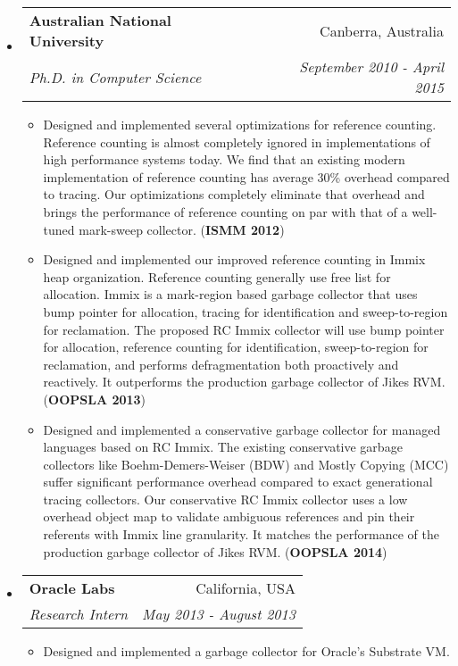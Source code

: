 \documentclass[letterpaper,11pt]{article}
\makeatletter
\newcommand{\resitem}[1]{\item #1 \vspace{-2pt}}
\newcommand{\ressubheading}[4]{
\begin{tabular*}{6.5in}{l@{\cftdotfill{\cftsecdotsep}\extracolsep{\fill}}r}
		\textbf{#1} & #2 \\
		\textit{#3} & \textit{#4} \\
\end{tabular*}\vspace{-6pt}}
\makeatother
\begin{document}
\begin{itemize}

\item
	\ressubheading{Australian National University}{Canberra,
          Australia}{Ph.D. in Computer Science}{September 2010 - April 2015}
	\begin{itemize}
	
	       \resitem {Designed and implemented several optimizations for reference counting.  Reference counting is almost completely ignored in implementations of high performance systems today. We find that an existing modern implementation of reference counting has average 30\% overhead compared to tracing. Our optimizations completely eliminate that overhead and brings the performance of reference counting on par with that of a well-tuned mark-sweep collector. ({\bf ISMM 2012})}


		\resitem {Designed and implemented our improved reference counting in Immix heap organization. Reference counting generally use free list for allocation. Immix is a mark-region based garbage collector that uses bump pointer for allocation, tracing for identification and sweep-to-region for reclamation. The proposed RC Immix collector will use bump pointer for allocation, reference counting for identification, sweep-to-region for reclamation, and performs defragmentation both proactively and reactively. It outperforms the production garbage collector of Jikes RVM. ({\bf OOPSLA 2013})}
		
                \resitem {Designed and implemented a conservative garbage collector for managed languages based on RC Immix. The existing conservative garbage collectors like Boehm-Demers-Weiser (BDW) and Mostly Copying (MCC) suffer significant performance overhead compared to exact generational tracing collectors. Our conservative RC Immix collector uses a low overhead object map to validate ambiguous references and pin their referents with Immix line granularity. It matches the performance of the production garbage collector of Jikes RVM. ({\bf OOPSLA 2014})}


	\end{itemize}

\item
	\ressubheading{Oracle Labs}{California, USA}{Research Intern}{May 2013 - August 2013}
	\begin{itemize}
          \resitem {Designed and implemented a garbage collector for Oracle's Substrate VM.}

          
	\end{itemize}


\end{itemize}
\end{document}
